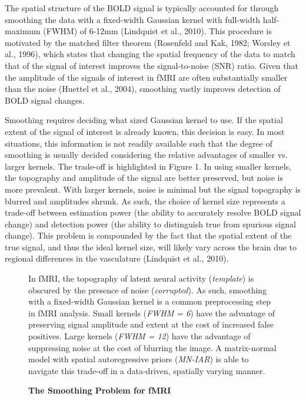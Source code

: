 \documentclass[9pt]{NEU560-final}
\begin{document}
The spatial structure of the BOLD signal is typically accounted for through smoothing the data with a fixed-width Gaussian kernel with full-width half-maximum (FWHM) of 6-12mm (Lindquist et al., 2010). This procedure is motivated by the matched filter theorem (Rosenfeld and Kak, 1982; Worsley et al., 1996), which states that changing the spatial frequency of the data to match that of the signal of interest improves the signal-to-noise (SNR) ratio. Given that the amplitude of the signals of interest in fMRI are often substantially smaller than the noise (Huettel et al., 2004), smoothing vastly improves detection of BOLD signal changes. 

Smoothing requires deciding what sized Gaussian kernel to use. If the spatial extent of the signal of interest is already known, this decision is easy. In most situations, this information is not readily available such that the degree of smoothing is usually decided considering the relative advantages of smaller vs. larger kernels. The trade-off is highlighted in Figure 1. In using smaller kernels, the topography and amplitude of the signal are better preserved, but noise is more prevalent. With larger kernels, noise is minimal but the signal topography is blurred and amplitudes shrunk. As such, the choice of kernel size represents a trade-off between estimation power (the ability to accurately resolve BOLD signal change) and detection power (the ability to distinguish true from spurious signal change). This problem is compounded by the fact that the spatial extent of the true signal, and thus the ideal kernel size, will likely vary across the brain due to regional differences in the vasculature (Lindquist et al., 2010).

\begin{figure}
\centerline{%
%
}
\caption{\textbf{The Smoothing Problem for fMRI}}
\par In fMRI, the topography of latent neural activity (\textit{template}) is obscured by the presence of noise (\textit{corrupted}). As such, smoothing with a fixed-width Gaussian kernel is a common preprocessing step in fMRI analysis. Small kernels (\textit{FWHM = 6}) have the advantage of preserving signal amplitude and extent at the cost of increased false positives. Large kernels (\textit{FWHM = 12}) have the advantage of suppressing noise at the cost of blurring the image. A matrix-normal model with spatial autoregressive priors (\textit{MN-IAR}) is able to navigate this trade-off in a data-driven, spatially varying manner. 
\end{figure}
\end{document}
